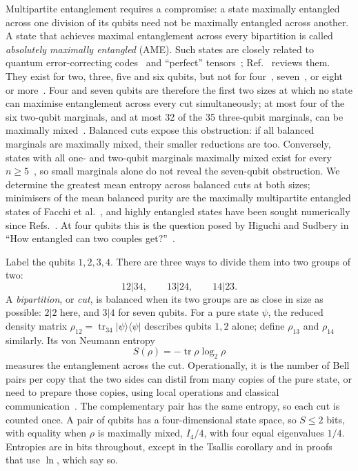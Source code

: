 \documentclass[11pt]{article}
\begin{document}
Multipartite entanglement requires a compromise: a state maximally entangled across one division of its qubits
need not be maximally entangled across another. A state that achieves maximal entanglement across every
bipartition is called \emph{absolutely maximally entangled} (AME). Such states are closely related to
quantum error-correcting codes~\cite{Scott} and ``perfect'' tensors~\cite{PYHP}; Ref.~\cite{AMEreview} reviews them. They exist for two, three, five and six qubits,
but not for four~\cite{HS,HSi26}, seven~\cite{HGS}, or eight or more~\cite{Scott}.
Four and seven qubits are therefore the first two sizes at which no state can maximise
entanglement across every cut simultaneously; at most four of the six two-qubit marginals, and at most 32 of the 35
three-qubit marginals, can be maximally mixed~\cite{HS,HGS,ZNSZ}. Balanced cuts expose this obstruction: if all
balanced marginals are maximally mixed, their smaller reductions are too. Conversely,
states with all one- and two-qubit marginals maximally mixed exist for every $n\ge5$~\cite{Scott},
so small marginals alone do not reveal the seven-qubit obstruction. We determine the greatest
mean entropy across balanced cuts at both sizes; minimisers of the mean balanced purity are the maximally multipartite
entangled states of Facchi et al.~\cite{FFPP}, and highly entangled states have been sought numerically since
Refs.~\cite{BSSB,Borras}. At four qubits this is the question posed by Higuchi and Sudbery in ``How entangled can two couples get?''~\cite{HS}.

Label the qubits $1,2,3,4$. There are three ways to divide them into two
groups of two:
\[
12|34,\qquad 13|24,\qquad 14|23.
\]
A \emph{bipartition}, or \emph{cut}, is balanced when its two groups are as close in size as possible:
$2|2$ here, and $3|4$ for seven qubits. For a pure state $\psi$, the reduced density matrix
$\rho_{12}=\operatorname{tr}_{34}|\psi\rangle\langle\psi|$ describes qubits $1,2$ alone; define
$\rho_{13}$ and $\rho_{14}$ similarly. Its von Neumann entropy
\[
S(\rho)=-\operatorname{tr}\rho\log_2\rho
\]
measures the entanglement across the cut. Operationally, it is the
number of Bell pairs per copy that the two sides can distil from many copies of the pure state, or need to prepare those copies,
using local operations and classical communication~\cite{BBPS}. The complementary pair has the same entropy, so each cut
is counted once. A pair of qubits
has a four-dimensional state space, so $S\le2$ bits, with equality when $\rho$ is maximally mixed,
$I_4/4$, with four equal eigenvalues $1/4$. Entropies are in bits throughout, except in the Tsallis
corollary and in proofs that use $\ln$, which say so.
\end{document}
